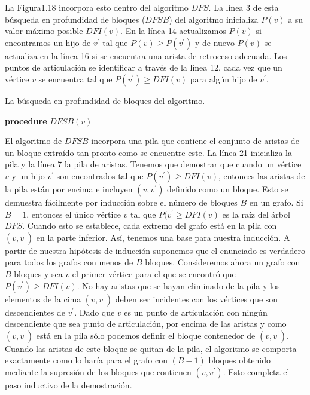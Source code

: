 \documentclass[10pt,a5paper]{book}
\begin{document}
La Figura1.18 incorpora esto dentro del algoritmo $DFS$. La línea 3 de esta búsqueda en profundidad de bloques ($DFSB$) del algoritmo inicializa $P(v)$ a su valor máximo posible $DFI(v)$. En la línea 14 actualizamos $P(v)$ si encontramos un hijo de $v^{'}$ tal que $P(v) \ge P(v^{'})$ y de nuevo $P(v)$ se actualiza en la línea 16 si se encuentra una arista de retroceso adecuada. Los puntos de articulación se identificar a través de la línea 12, cada vez que un vértice $v$ se encuentra tal que $P(v^{'}) \ge DFI(v)$ para algún hijo de $v^{'}$.\\
\vfill
\nopagebreak
\begin{algorithm}[H]
\caption{La búsqueda en profundidad de bloques del algoritmo.}
\BlankLine
\dontprintsemicolon
\textbf{procedure} $DFSB(v)$

\end{algorithm}

El algoritmo de $DFSB$ incorpora una pila que contiene el conjunto de aristas de un bloque extraído tan pronto como se encuentre este. La línea 21 inicializa la pila y la línea 7 la pila de aristas. Tenemos que demostrar que cuando un vértice $v$ y un hijo $v^{'}$ son encontrados tal que $P(v^{'}) \ge DFI(v)$, entonces las aristas de la pila están por encima e incluyen $(v,v^{'})$ definido como un bloque. Esto se demuestra fácilmente por inducción sobre el número de bloques $B$ en un grafo. Si $B = 1$, entonces el único vértice $v$ tal que $P(v^{'} \ge DFI(v)$ es la raíz del árbol $DFS$. Cuando esto se establece, cada extremo del grafo está en la pila con $(v,v^{'})$ en la parte inferior. Así, tenemos una base para nuestra inducción. A partir de nuestra hipótesis de inducción suponemos que el enunciado es verdadero para todos los grafos con menos de $B$ bloques. Consideremos ahora un grafo con $B$ bloques y sea $v$ el primer vértice para el que se encontró que $P(v^{'}) \ge DFI(v)$. No hay aristas que se hayan eliminado de la pila y los elementos de la cima $(v,v^{'})$ deben ser incidentes con los vértices que son descendientes de $v^{'}$. Dado que $v$ es un punto de articulación con ningún descendiente que sea punto de articulación, por encima de las aristas y como $(v,v^{'})$ está en la pila sólo podemos definir el bloque contenedor de $(v,v^{'})$. Cuando las aristas de este bloque se quitan de la pila, el algoritmo se comporta exactamente como lo haría para el grafo con $(B-1)$ bloques obtenido mediante la supresión de los bloques que contienen $(v,v^{'})$. Esto completa el paso inductivo de la demostración.
\end{document}
